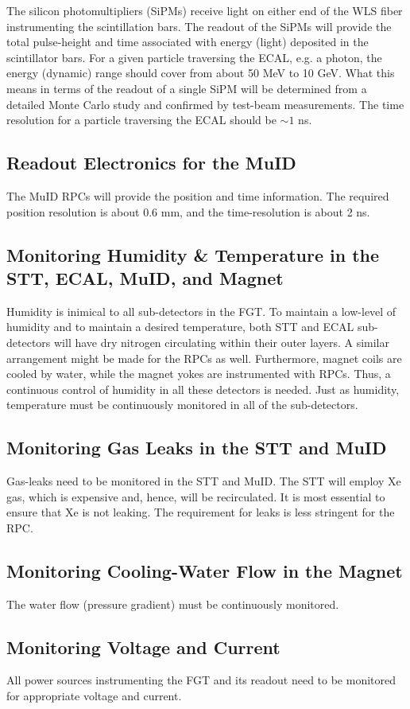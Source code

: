 \documentclass[aps,prl,preprint,groupedaddress]{revtex4}
\begin{document}
The silicon photomultipliers (SiPMs) receive light on either end of
the WLS fiber 
instrumenting the scintillation bars. The readout of the SiPMs will provide the total 
pulse-height and time associated with energy (light) deposited in the scintillator bars. 
For a given particle traversing the ECAL, e.g. a photon, the energy (dynamic) range 
should cover from about 50 MeV to 10 GeV. What this means in terms of
the readout of a single SiPM will be determined from a detailed Monte Carlo study 
and confirmed by test-beam measurements.
The time resolution for a particle traversing the ECAL should be $\sim 1$ ns.

\subsection{Readout Electronics for the MuID}

The MuID RPCs will provide the position and time information. The required position 
resolution is about 0.6 mm, and the time-resolution is about 2 ns.

\subsection{Monitoring Humidity \& Temperature in the STT, ECAL, MuID, and Magnet}

Humidity is inimical to all sub-detectors in the FGT. To maintain a low-level of 
humidity and to maintain a desired temperature, both STT and ECAL sub-detectors
will have dry nitrogen circulating within their outer layers. A similar arrangement 
might be made for the RPCs as well. Furthermore, magnet coils are cooled by water, 
while the magnet yokes are instrumented with RPCs. Thus, a continuous control of 
humidity in all these detectors is needed.
Just as humidity, temperature must be continuously monitored in all of the sub-detectors.

\subsection{Monitoring Gas Leaks in the STT and MuID}

Gas-leaks need to be monitored in the STT and MuID.
The STT will employ Xe gas, which is expensive and, hence, will be recirculated. It is 
most essential to ensure that Xe is not leaking. The requirement for leaks is less 
stringent for the RPC. 

\subsection{Monitoring Cooling-Water Flow in the Magnet}

The water flow (pressure gradient) must be continuously monitored.

\subsection{Monitoring Voltage and Current}

All power sources instrumenting the FGT and its readout need to be monitored for 
appropriate voltage and current.

\vfill\eject
\end{document}
